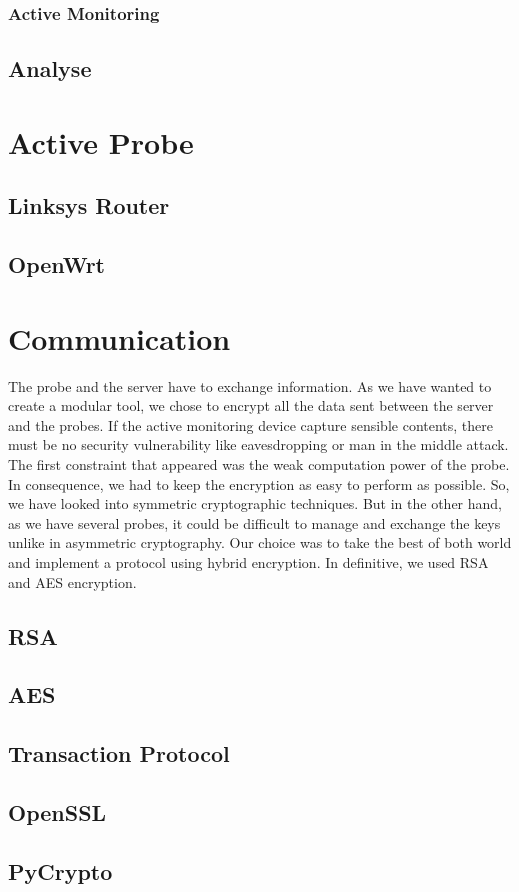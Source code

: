 \subsubsection{Active Monitoring}

\subsection{Analyse}

\section{Active Probe}
\subsection{Linksys Router}
\subsection{OpenWrt}

\section{Communication}
The probe and the server have to exchange information. As we have wanted to create a modular tool, we chose to encrypt all the data sent between the server and the probes. If the active monitoring device capture sensible contents, there must be no security vulnerability like eavesdropping or man in the middle attack.
The first constraint that appeared was the weak computation power of the probe. In consequence, we had to keep the encryption as easy to perform as possible. So, we have looked into symmetric cryptographic techniques. But in the other hand, as we have several probes, it could be difficult to manage and exchange the keys unlike in asymmetric cryptography. Our choice was to take the best of both world and implement a protocol using hybrid encryption.
In definitive, we used RSA and AES encryption.
\subsection{RSA}
\subsection{AES}
\subsection{Transaction Protocol}
\subsection{OpenSSL}
\subsection{PyCrypto}
